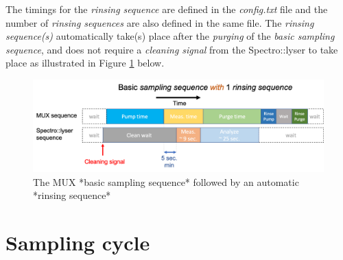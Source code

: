 \documentclass[]{book}
\begin{document}
The timings for the \emph{rinsing sequence} are defined in the \emph{config.txt} file and the number of \emph{rinsing sequences} are also defined in the same file. The \emph{rinsing sequence(s)} automatically take(s) place after the \emph{purging} of the \emph{basic sampling sequence}, and does not require a \emph{cleaning signal} from the Spectro::lyser to take place as illustrated in Figure \ref{fig:BasicSequenceWith1Rinsing} below.

\begin{figure}

{\centering \includegraphics[width=1\linewidth]{pictures/BasicSequenceWith1Rinsing} 

}

\caption{The MUX *basic sampling sequence* followed by an automatic *rinsing sequence*}\label{fig:BasicSequenceWith1Rinsing}
\end{figure}

\hypertarget{sampling-cycle}{%
\section{Sampling cycle}\label{sampling-cycle}}
\end{document}
